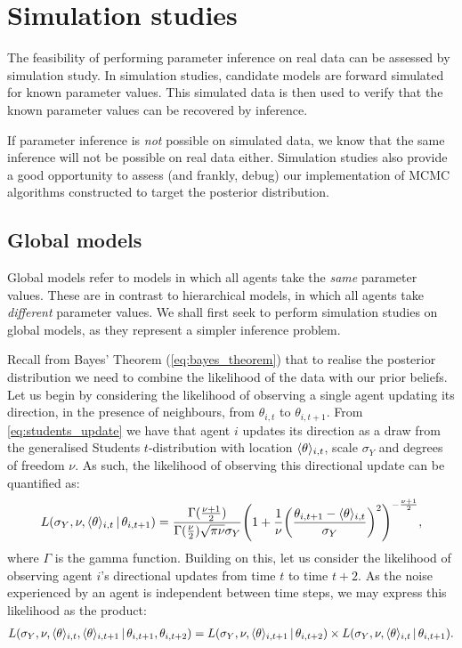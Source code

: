 \graphicspath{{fig/sim_studies/}}

\chapter{Simulation studies}
\label{cha:sim_studies}

The feasibility of performing parameter inference on real data can be assessed
by simulation study. In simulation studies, candidate models are forward
simulated for known parameter values. This simulated data is then used to
verify that the known parameter values can be recovered by inference.

If parameter inference is \emph{not} possible on simulated data, we know that
the same inference will not be possible on real data either. Simulation studies
also provide a good opportunity to assess (and frankly, debug) our
implementation of MCMC algorithms constructed to target the posterior
distribution.

\section{Global models}
\label{sec:global_models}

Global models refer to models in which all agents take the \emph{same}
parameter values. These are in contrast to hierarchical models, in which all
agents take \emph{different} parameter values.  We shall first seek to perform
simulation studies on global models, as they represent a simpler inference
problem.

Recall from Bayes' Theorem (\cref{eq:bayes_theorem}) that to realise the
posterior distribution we need to combine the likelihood of the data with our
prior beliefs. Let us begin by considering the likelihood of observing a single
agent updating its direction, in the presence of neighbours, from $\theta_{i,
t}$ to $\theta_{i, t+1}$.  From \cref{eq:students_update} we have that agent
$i$ updates its direction as a draw from the generalised Students
$t$-distribution with location $\langle\theta\rangle_{i,t}$, scale $\sigma_Y$ and
degrees of freedom $\nu$. As such, the likelihood of observing this directional
update can be quantified as:
\begin{equation*}
  L(\sigma_Y, \nu, \langle\theta\rangle_{i,t} \,|\, \theta_{i,t+1}) =
  \frac{\Gamma(\frac{\nu +1 }{2})}{\Gamma(\frac{\nu}{2})\sqrt{\pi\nu}\sigma_Y}
  \Bigg(1 + \frac{1}{\nu}
  \bigg(\frac{\theta_{i,t+1}-\langle\theta\rangle_{i,t}}{\sigma_Y}\bigg)^2
  \Bigg)^{-\frac{\nu+1}{2}},
\end{equation*}
where $\Gamma$ is the gamma function. Building on this, let us consider the
likelihood of observing agent $i$'s directional updates from time $t$ to time
$t+2$. As the noise experienced by an agent is independent between time steps,
we may express this likelihood as the product:
\begin{align*}
  L(\sigma_Y,\nu,\langle\theta\rangle_{i,t},\langle\theta\rangle_{i,t+1}\,|\,\theta_{i,t+1},
  \theta_{i,t+2})
  = L(\sigma_Y,\nu,\langle\theta\rangle_{i,t+1}\,|\,\theta_{i,t+2})\times
  L(\sigma_Y,\nu,\langle\theta\rangle_{i,t}\,|\,\theta_{i,t+1}).
\end{align*}

